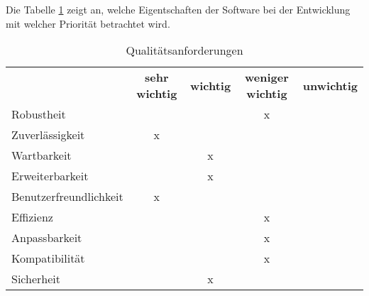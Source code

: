 Die Tabelle \ref{tabelle:qualitaetsanforderungen} zeigt an, welche Eigentschaften der Software bei der Entwicklung mit welcher Priorität betrachtet wird.

\begin{table}[h]
	\centering
	\begin{tabularx}{\textwidth}{l c c c c}
		\rowcolor[HTML]{C0C0C0} 
		& \textbf{sehr wichtig} & \textbf{wichtig} & \textbf{weniger wichtig} & \textbf{unwichtig} \\
		Robustheit &  &  & x &  \\
		\rowcolor[HTML]{E7E7E7} 
		Zuverlässigkeit & x &  &  &  \\
		Wartbarkeit &  & x &  &  \\
		\rowcolor[HTML]{E7E7E7} 
		Erweiterbarkeit &  & x &  &  \\
		Benutzerfreundlichkeit & x &  &  &  \\
		\rowcolor[HTML]{E7E7E7} 
		Effizienz &  &  & x &  \\
		Anpassbarkeit &  &  & x &  \\
		\rowcolor[HTML]{E7E7E7} 
		Kompatibilität &  &  & x &  \\
		Sicherheit &  & x &  & 
	\end{tabularx}
	\caption{Qualitätsanforderungen}
	\label{tabelle:qualitaetsanforderungen}
\end{table}